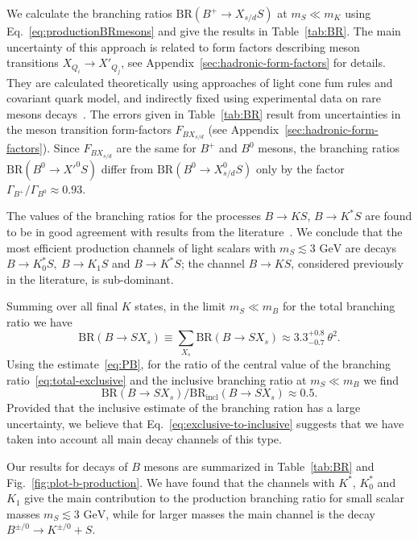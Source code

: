 \documentclass[a4paper,12pt,dvipsnames,usernames]{article}
\begin{document}
We calculate the branching ratios $\text{BR}(B^{+}\to X_{s/d}S)$ at $m_{S} \ll m_{K}$ using Eq.~\eqref{eq:productionBRmesons} and give the results in Table~\ref{tab:BR}. The main uncertainty of this approach is related to form factors describing meson transitions $X_{Q_{i}} \to X'_{Q_{j}}$, see Appendix~\ref{sec:hadronic-form-factors} for details. They are calculated theoretically using approaches of light cone fum rules and covariant quark model, and indirectly fixed using experimental data on rare mesons decays~\cite{Ball:2004rg,Ball:2004ye,Cheng:2010yd,Sun:2010nv,Lu:2011jm}. The errors given in Table~\ref{tab:BR} result from uncertainties in the meson transition form-factors $F_{BX_{s/d}}$ (see Appendix~\ref{sec:hadronic-form-factors}). Since $F_{BX_{s/d}}$ are the same for $B^{+}$ and $B^{0}$ mesons, the branching ratios $\text{BR}(B^{0}\to X'^{0}S)$ differ from $\text{BR}(B^{0}\to X_{s/d}^{0}S)$ only by the factor $\Gamma_{B^{+}}/\Gamma_{B^{0}} \approx 0.93$.

The values of the branching ratios for the processes $B \to KS$, $B \to K^{*}S$ are found to be in good agreement with results from the literature~\cite{Batell:2009jf,Winkler:2018qyg}. We conclude that the most efficient production channels of light scalars with $m_{S}\lesssim 3\text{ GeV}$ are decays $B \to K_{0}^{*}S, \ B\to K_{1}S$ and $B\to K^{*}S$; the channel $B \to KS$, considered previously in the literature, is sub-dominant.

Summing over all final $K$ states, in the limit $m_{S}\ll m_{B}$ for the total branching ratio we have
\begin{equation}
\label{eq:total-exclusive}
    \text{BR}(B \to SX_{s}) \equiv \sum_{X_{s}}\text{BR}(B\to SX_{s}) \approx 3.3^{+0.8}_{-0.7}\ \theta^{2}.
\end{equation} 
Using the estimate~\eqref{eq:PB}, for the ratio of the central value of the branching ratio~\eqref{eq:total-exclusive} and the inclusive branching ratio at $m_{S} \ll m_{B}$ we find
\begin{equation}
     \text{BR}(B \to SX_{s})/ \text{BR}_{\text{incl}}(B \to SX_{s}) \approx 0.5.
     \label{eq:exclusive-to-inclusive}
\end{equation}
Provided that the inclusive estimate of the branching ration has a large uncertainty, we believe that Eq.~\eqref{eq:exclusive-to-inclusive} suggests that we have taken into account all main decay channels of this type.
 
Our results for decays of $B$ mesons are summarized in Table~\ref{tab:BR} and Fig.~\ref{fig:plot-b-production}. We have found that the channels with $K^{*}$, $K_{0}^{*}$ and $K_{1}$ give the main contribution to the production branching ratio for small scalar masses $m_{S} \lesssim 3\text{ GeV}$, while for larger masses the main channel is the decay $B^{\pm/0}\to K^{\pm/0}+S$. 
\end{document}
